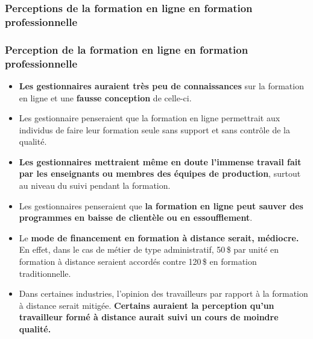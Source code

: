 					\subsubsection{Perceptions de la formation en ligne en formation professionnelle} 
						\begin{frame}[allowframebreaks]
						\frametitle{Perception de la formation en ligne en formation professionnelle}
                        			
                        			\begin{itemize}
                        			\item \textbf{Les gestionnaires auraient très peu de connaissances} sur la formation en ligne et une \textbf{fausse conception} de celle-ci. 
                        			\item Les gestionnaire penseraient que la formation en ligne permettrait aux individus de faire leur formation seule sans support et sans contrôle de la qualité. 
                        			\item \textbf{Les gestionnaires mettraient même en doute l’immense travail fait par les enseignants ou membres des équipes de production}, surtout au niveau du suivi pendant la formation.
                        			\item Les gestionnaires penseraient que\textbf{ la formation en ligne peut sauver des programmes en baisse de clientèle ou en essoufflement}. 
                        			\item Le \textbf{mode de financement en formation à distance serait, médiocre.} En effet, dans le cas de métier de type administratif, 50\,\$ par unité en formation à distance seraient accordés contre 120\,\$ en formation traditionnelle. 
                        			\item Dans certaines industries, l’opinion des travailleurs par rapport à la formation à distance serait mitigée. \textbf{Certains auraient la perception qu’un travailleur formé à distance aurait suivi un cours de moindre qualité.}
                        			
						\end{itemize}
						\end{frame}	
						
